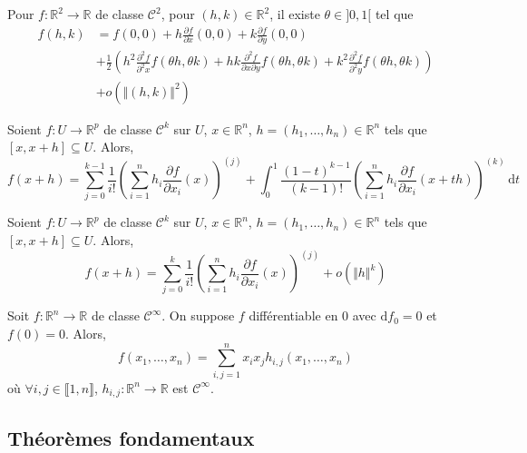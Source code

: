 	\begin{example}
		Pour $f : \mathbb{R}^2 \rightarrow \mathbb{R}$ de classe $\mathcal{C}^2$, pour $(h, k) \in \mathbb{R}^2$, il existe $\theta \in ]0,1[$ tel que
		\begin{align*}
			f(h,k) &= f(0,0) + h \frac{\partial f}{\partial x}(0,0) + k \frac{\partial f}{\partial y}(0,0) \\
			&+ \frac{1}{2} \left( h^2 \frac{\partial^2 f}{\partial^2 x} f(\theta h, \theta k) + hk \frac{\partial^2 f}{\partial x \partial y} f(\theta h, \theta k) + k^2 \frac{\partial^2 f}{\partial^2 y} f(\theta h, \theta k) \right) \\
			&+ o(\Vert (h,k) \Vert^2)
		\end{align*}
	\end{example}
	
	\begin{theorem}
		Soient $f : U \rightarrow \mathbb{R}^p$ de classe $\mathcal{C}^k$ sur $U$, $x \in \mathbb{R}^n$, $h = (h_1, \dots, h_n) \in \mathbb{R}^n$ tels que $[x,x+h] \subseteq U$. Alors,
		\[ f(x+h) = \sum_{j=0}^{k-1} \frac{1}{i!} \left( \sum_{i=1}^n h_i \frac{\partial f}{\partial x_i} (x) \right)^{(j)} + \int_0^1 \frac{(1-t)^{k-1}}{(k-1)!} \left( \sum_{i=1}^{n} h_i \frac{\partial f}{\partial x_i} (x+th) \right)^{(k)} \, \mathrm{d}t \]
	\end{theorem}
	
	\begin{theorem}
		Soient $f : U \rightarrow \mathbb{R}^p$ de classe $\mathcal{C}^k$ sur $U$, $x \in \mathbb{R}^n$, $h = (h_1, \dots, h_n) \in \mathbb{R}^n$ tels que $[x,x+h] \subseteq U$. Alors,
		\[ f(x+h) = \sum_{j=0}^{k} \frac{1}{i!} \left( \sum_{i=1}^n h_i \frac{\partial f}{\partial x_i} (x) \right)^{(j)} + o(\Vert h \Vert^k) \]
	\end{theorem}
	
	\begin{application}
		Soit $f : \mathbb{R}^n \rightarrow \mathbb{R}$ de classe $\mathcal{C}^\infty$. On suppose $f$ différentiable en $0$ avec $\mathrm{d}f_0 = 0$ et $f(0) = 0$. Alors,
		\[ f(x_1, \dots, x_n) = \sum_{i,j=1}^n x_i x_j h_{i,j}(x_1, \dots, x_n) \]
		où $\forall i,j \in \llbracket 1, n \rrbracket$, $h_{i,j} : \mathbb{R}^n \rightarrow \mathbb{R}$ est $\mathcal{C}^\infty$.
	\end{application}
	
	\subsection{Théorèmes fondamentaux}
	
